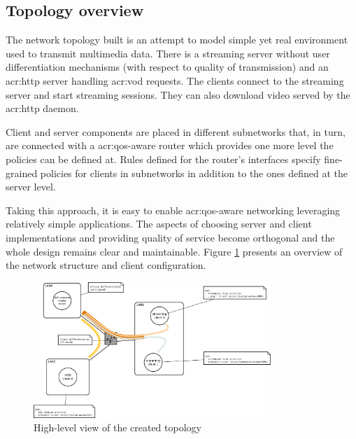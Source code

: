\documentclass[11pt]{book}
\begin{document}
      \subsection{Topology overview}

        The network topology built is an attempt to model simple yet real environment used to transmit multimedia data.
        There is a streaming server without user differentiation mechanisms (with respect to quality of transmission)
        and an \gls{acr:http} server handling \gls{acr:vod} requests. The clients connect to the streaming server and
        start streaming sessions. They can also download video served by the \gls{acr:http} daemon.

        Client and server components are placed in different subnetworks that, in turn, are connected with a
        \gls{acr:qos}-aware router which provides one more level the policies can be defined at. Rules defined for the
        router's interfaces specify fine-grained policies for clients in subnetworks in addition to the ones defined at
        the server level.

        Taking this approach, it is easy to enable \gls{acr:qos}-aware networking leveraging relatively simple
        applications. The aspects of choosing server and client implementations and providing quality of service become
        orthogonal and the whole design remains clear and maintainable. Figure \ref{fig:cs:scenario} presents an
        overview of the network structure and client configuration.
      
        \begin{figure}[H]
          \begin{center}
            \includegraphics[width=0.8\textwidth]{img/test-case/diagram.pdf}
          \end{center}

          \caption{High-level view of the created topology}
          \label{fig:cs:scenario}
        \end{figure}
      
\end{document}
